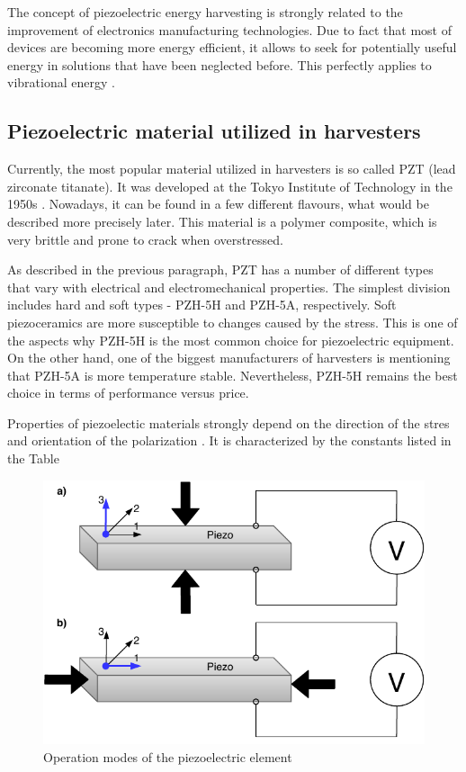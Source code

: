 \documentclass[12pt,a4paper]{article}
\begin{document}
The concept of piezoelectric energy harvesting is strongly related to the improvement of electronics manufacturing technologies. Due to fact that most of devices are becoming more energy efficient, it allows to seek for potentially useful energy in solutions that have been neglected before. This perfectly applies to vibrational energy \cite{low_freq}. 

\subsection{Piezoelectric material utilized in harvesters}
Currently, the most popular material utilized in harvesters is so called PZT (lead zirconate titanate). It was developed at the Tokyo Institute of Technology in the 1950s \cite{EnHv2}. Nowadays, it can be found in a few different flavours, what would be described more precisely later. This material is a polymer composite, which is very brittle and prone to crack when overstressed\cite{cmos}.
\par

As described in the previous paragraph, PZT has a number of different types that vary with electrical and electromechanical properties. The simplest division includes hard and soft types - PZH-5H and PZH-5A, respectively. Soft piezoceramics are more susceptible to changes caused by the stress. This is one of the aspects why PZH-5H is the most common choice for piezoelectric equipment. On the other hand, one of the biggest manufacturers of harvesters \cite{PPA} is mentioning that PZH-5A is more temperature stable. Nevertheless, PZH-5H remains the best choice in terms of performance versus price. 
\par

Properties of piezoelectic materials strongly depend on the direction of the stres and orientation of the polarization \cite{EnHv1}. It is characterized by the constants listed in the Table 

\begin{figure}[ht!]
\includegraphics[scale=1]{piezo_operation_modes.pdf}
\caption{Operation modes of the piezoelectric element}
\label{fig:piezo_modes}
\end{figure}
\end{document}
